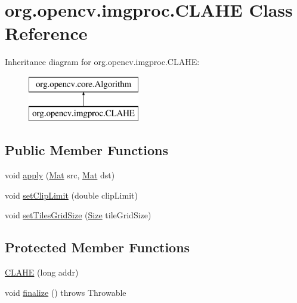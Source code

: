 \hypertarget{classorg_1_1opencv_1_1imgproc_1_1_c_l_a_h_e}{}\section{org.\+opencv.\+imgproc.\+C\+L\+A\+HE Class Reference}
\label{classorg_1_1opencv_1_1imgproc_1_1_c_l_a_h_e}
Inheritance diagram for org.\+opencv.\+imgproc.\+C\+L\+A\+HE\+:\begin{figure}[H]
\begin{center}
\leavevmode
\includegraphics[height=2.000000cm]{classorg_1_1opencv_1_1imgproc_1_1_c_l_a_h_e}
\end{center}
\end{figure}
\subsection*{Public Member Functions}
\begin{DoxyCompactItemize}
\item 
void \mbox{\hyperlink{classorg_1_1opencv_1_1imgproc_1_1_c_l_a_h_e_a3385ac24a9666b2bcd004c856c6ff454}{apply}} (\mbox{\hyperlink{classorg_1_1opencv_1_1core_1_1_mat}{Mat}} src, \mbox{\hyperlink{classorg_1_1opencv_1_1core_1_1_mat}{Mat}} dst)
\item 
void \mbox{\hyperlink{classorg_1_1opencv_1_1imgproc_1_1_c_l_a_h_e_ae31aa063b3ac13e4d469c069cda0fcf1}{set\+Clip\+Limit}} (double clip\+Limit)
\item 
void \mbox{\hyperlink{classorg_1_1opencv_1_1imgproc_1_1_c_l_a_h_e_a167d3cc2884fd7c6fb8b34b5e04a9523}{set\+Tiles\+Grid\+Size}} (\mbox{\hyperlink{classorg_1_1opencv_1_1core_1_1_size}{Size}} tile\+Grid\+Size)
\end{DoxyCompactItemize}
\subsection*{Protected Member Functions}
\begin{DoxyCompactItemize}
\item 
\mbox{\hyperlink{classorg_1_1opencv_1_1imgproc_1_1_c_l_a_h_e_abb38586385e8fa823d9d7cb500a20e37}{C\+L\+A\+HE}} (long addr)
\item 
void \mbox{\hyperlink{classorg_1_1opencv_1_1imgproc_1_1_c_l_a_h_e_a6fb0dce1f07bdad5742bb87e7824b221}{finalize}} ()  throws Throwable 
\end{DoxyCompactItemize}
